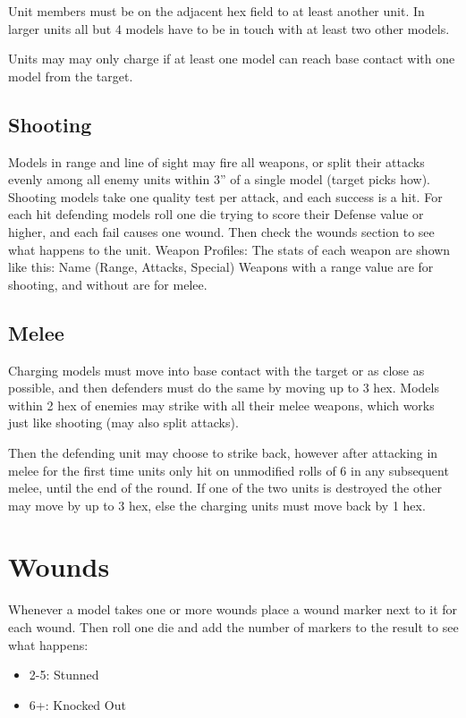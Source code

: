 \documentclass[6pt]{scrreport}
\begin{document}
  Unit members must be on the adjacent hex field to at least
  another unit. In larger units all but 4 models have to
  be in touch with at least two other models.

  Units may
  may only charge if at least one model
  can reach base contact with one model
  from the target.

  \section*{Shooting}

  Models in range and line of sight may
  fire all weapons, or split their attacks
  evenly among all enemy units within 3”
  of a single model (target picks how).
  Shooting models take one quality test
  per attack, and each success is a hit. For
  each hit defending models roll one die
  trying to score their Defense value or
  higher, and each fail causes one wound.
  Then check the wounds section to see
  what happens to the unit.
  Weapon Profiles: The stats of each
  weapon are shown like this:
  Name (Range, Attacks, Special)
  Weapons with a range value are for
  shooting, and without are for melee.

  \section*{Melee}

  Charging models must move into base
  contact with the target or as close as
  possible, and then defenders must do
  the same by moving up to 3 hex. Models
  within 2 hex of enemies may strike with all
  their melee weapons, which works just
  like shooting (may also split attacks).

  Then the defending unit may choose to
  strike back, however after attacking in
  melee for the first time units only hit on
  unmodified rolls of 6 in any subsequent
  melee, until the end of the round. If one
  of the two units is destroyed the other
  may move by up to 3 hex, else the charging
  units must move back by 1 hex.

  \chapter*{Wounds}

  Whenever a model takes one or more
  wounds place a wound marker next to it
  for each wound. Then roll one die and
  add the number of markers to the result
  to see what happens:
  \begin{itemize}
    \item 2-5: Stunned
    \item 6+: Knocked Out
  \end{itemize}
\end{document}
